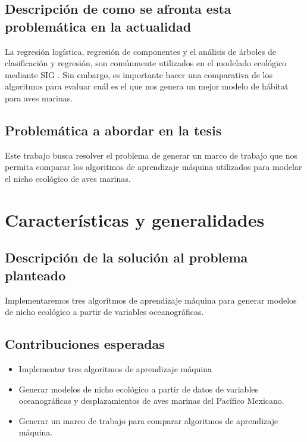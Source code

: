 \documentclass[runningheads,a4paper]{llncs}
\begin{document}
\subsection{Descripción de como se afronta esta problemática en la actualidad}

La regresión logística, regresión de componentes y el análisis de árboles de
clasificación y regresión, son comúnmente utilizados en el modelado ecológico
mediante SIG \cite{munoz2004comparison}. Sin embargo, es importante hacer una
comparativa de los algoritmos para evaluar cuál es el que nos genera un mejor
modelo de hábitat para aves marinas.


\subsection{Problemática a abordar en la tesis}

Este trabajo busca resolver el problema de generar un marco de trabajo que nos
permita comparar los algoritmos de aprendizaje máquina utilizados para modelar
el nicho ecológico de aves marinas.

\section{Características y generalidades}
\subsection{Descripción de la solución al problema planteado}

Implementaremos tres algoritmos de aprendizaje máquina para generar modelos de
nicho ecológico a partir de variables oceanográficas. 

\subsection{Contribuciones esperadas}

\begin{itemize}
    \item Implementar tres algoritmos de aprendizaje máquina 
    \item Generar modelos de nicho ecológico a partir de datos de variables
    oceanográficas y desplazamientos de aves marinas del Pacífico Mexicano.
    \item Generar un marco de trabajo para comparar algoritmos de aprendizaje máquina.
\end{itemize}
\end{document}
